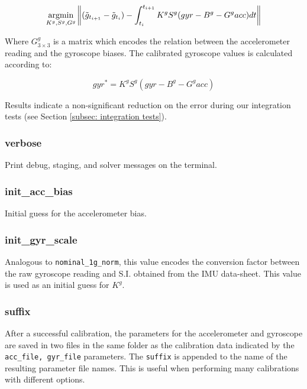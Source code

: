 \begin{equation}
	\operatorname*{argmin}_{K^g, S^g, G^g} \left\|(\tilde{g}_{t_{i+1}}-\tilde{g}_{t_i}) - \int_{t_i}^{t_{i+1}} K^gS^g(gyr - B^g - G^gacc)dt\right\|
\end{equation}

Where $G^g_{3\times 3}$ is a matrix which encodes the relation between the accelerometer reading and the gyroscope biases.
%
The calibrated gyroscope values is calculated according to:

\begin{equation} 
	gyr^* = K^gS^g(gyr - B^g - G^gacc) 
\end{equation}
 
 
Results indicate a non-significant reduction on the error during our integration tests (see Section \ref{subsec: integration tests}).


\subsubsection*{verbose}

Print debug, staging, and solver messages on the terminal.

\subsubsection*{init\_acc\_bias}
Initial guess for the accelerometer bias.

\subsubsection*{init\_gyr\_scale}
Analogous to \texttt{nominal\_1g\_norm}, this value encodes the conversion factor between the raw gyroscope reading and S.I. obtained from the IMU data-sheet.
%
This value is used as an initial guess for $K^g$.

\subsubsection*{suffix}
After a successful calibration, the parameters for the accelerometer and gyroscope are saved in two files in the same folder as the calibration data indicated by the \texttt{acc\_file, gyr\_file} parameters.
%
The \texttt{suffix} is appended to the name of the resulting parameter file names.
%
This is useful when performing many calibrations with different options.

